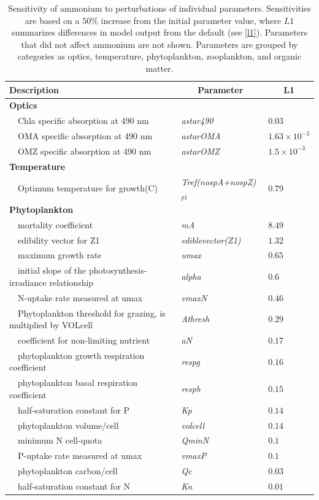 \documentclass[letterpaper,12pt,oneside]{article}\usepackage[]{graphicx}\usepackage[]{color}
\begin{document}
\begin{table}[!tbp]
{\footnotesize
\caption{Sensitivity of ammonium to perturbations of individual parameters.  Sensitivities are based on a 50\% increase from the initial parameter value, where $L1$ summarizes differences in model output from the default (see \cref{l1}).  Parameters that did not affect ammonium are not shown.  Parameters are grouped by categories as optics, temperature, phytoplankton, zooplankton, and organic matter.\label{tab:nh4sens}} 
\begin{center}
\begin{tabular}{lll}
\hline\hline
\multicolumn{1}{l}{Description}&\multicolumn{1}{c}{Parameter}&\multicolumn{1}{c}{L1}\tabularnewline
\hline
{\bfseries Optics}&&\tabularnewline
~~Chla specific absorption at 490 nm&\textit{astar490}&$0.03$\tabularnewline
~~OMA specific absorption at 490 nm&\textit{astarOMA}&$1.63\times 10^{-3}$\tabularnewline
~~OMZ specific absorption at 490 nm&\textit{astarOMZ}&$1.5\times 10^{-3}$\tabularnewline
\hline
{\bfseries Temperature}&&\tabularnewline
~~Optimum temperature for growth(C)&\textit{Tref(nospA+nospZ)$_{p1}$}&$0.79$\tabularnewline
\hline
{\bfseries Phytoplankton}&&\tabularnewline
~~mortality coefficient&\textit{mA}&$8.49$\tabularnewline
~~edibility vector for Z1&\textit{ediblevector(Z1)}&$1.32$\tabularnewline
~~maximum growth rate&\textit{umax}&$0.65$\tabularnewline
~~initial slope of the photosynthesis-irradiance relationship&\textit{alpha}&$0.6$\tabularnewline
~~N-uptake rate measured at umax&\textit{vmaxN}&$0.46$\tabularnewline
~~Phytoplankton threshold for grazing, is multiplied by VOLcell&\textit{Athresh}&$0.29$\tabularnewline
~~coefficient for non-limiting nutrient&\textit{aN}&$0.17$\tabularnewline
~~phytoplankton growth respiration coefficient&\textit{respg}&$0.16$\tabularnewline
~~phytoplankton basal respiration coefficient&\textit{respb}&$0.15$\tabularnewline
~~half-saturation constant for P&\textit{Kp}&$0.14$\tabularnewline
~~phytoplankton volume/cell&\textit{volcell}&$0.14$\tabularnewline
~~minimum N cell-quota&\textit{QminN}&$0.1$\tabularnewline
~~P-uptake rate measured at umax&\textit{vmaxP}&$0.1$\tabularnewline
~~phytoplankton carbon/cell&\textit{Qc}&$0.03$\tabularnewline
~~half-saturation constant for N&\textit{Kn}&$0.01$\tabularnewline

\end{tabular}
\end{center}}
\end{table}
\end{document}
